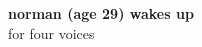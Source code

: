 \documentclass[a4paper]{book}
\begin{document}
\begin{titlepage}
\begin{flushright}
{\Huge \bfseries norman (age 29) wakes up \\ }
{\large for four voices \\}
\par
{}
\end{flushright}
\end{titlepage}
\thispagestyle{empty} 
\frontmatter
\clearpage
\end{document}
